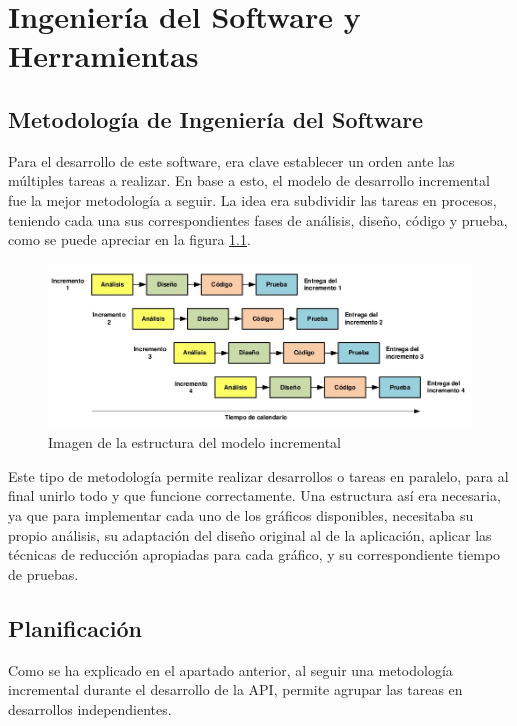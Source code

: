 \chapter{Ingeniería del Software y Herramientas}

\section{Metodología de Ingeniería del Software}

Para el desarrollo de este software, era clave establecer un orden ante las múltiples tareas a realizar. En base a esto, el modelo de desarrollo incremental fue la mejor metodología a seguir. La idea era subdividir las tareas en procesos, teniendo cada una sus correspondientes fases de análisis, diseño, código y prueba, como se puede apreciar en la figura \ref{fig:modeloincremental}.

\begin{figure}
	\centering
	\includegraphics[width=1\linewidth]{imagenes/modelo_incremental}
	\caption{Imagen de la estructura del modelo incremental \cite{modeloIncremental}}
	\label{fig:modeloincremental}
\end{figure}

Este tipo de metodología permite realizar desarrollos o tareas en paralelo, para al final unirlo todo y que funcione correctamente. Una estructura así era necesaria, ya que para implementar cada uno de los gráficos disponibles, necesitaba su propio análisis, su adaptación del diseño original al de la aplicación, aplicar las técnicas de reducción apropiadas para cada gráfico, y su correspondiente tiempo de pruebas.

\section{Planificación}

Como se ha explicado en el apartado anterior, al seguir una metodología incremental durante el desarrollo de la API, permite agrupar las tareas en desarrollos independientes.

